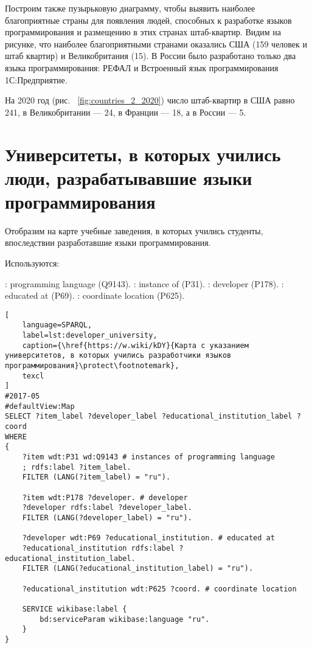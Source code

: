 Построим также пузырьковую диаграмму, чтобы выявить наиболее благоприятные страны для появления людей, способных к разработке языков программирования и размещению в этих странах штаб-квартир. Видим на рисунке, что наиболее благоприятными странами оказались США (159 человек и штаб квартир) и Великобритания (15). В России было разработано только два языка программирования: РЕФАЛ и Встроенный язык программирования 1С:Предприятие.

На 2020 год (рис. ~\ref{fig:countries_2_2020}) число штаб-квартир в США равно 241, в Великобритании — 24, в Франции — 18, а в России — 5.

\section{Университеты, в которых учились люди, разрабатывавшие языки программирования}
Отобразим на карте учебные заведения, в которых учились студенты, впоследствии разработавшие языки программирования.

Используются:
\begin{itemize}
: programming language (Q9143).
: instance of (P31).
: developer (P178).
: educated at (P69).
: coordinate location (P625).
\end{itemize}


\begin{lstlisting}[
	language=SPARQL,
	label=lst:developer_university,
	caption={\href{https://w.wiki/kDY}{Карта с указанием университетов, в которых учились разработчики языков программирования}\protect\footnotemark},
	texcl
]
#2017-05
#defaultView:Map
SELECT ?item_label ?developer_label ?educational_institution_label ?coord
WHERE
{
    ?item wdt:P31 wd:Q9143 # instances of programming language
    ; rdfs:label ?item_label. 
    FILTER (LANG(?item_label) = "ru"). 
    
    ?item wdt:P178 ?developer. # developer
    ?developer rdfs:label ?developer_label. 
    FILTER (LANG(?developer_label) = "ru"). 
    	
    ?developer wdt:P69 ?educational_institution. # educated at
    ?educational_institution rdfs:label ?educational_institution_label. 
    FILTER (LANG(?educational_institution_label) = "ru").
    
    ?educational_institution wdt:P625 ?coord. # coordinate location
    
    SERVICE wikibase:label {
        bd:serviceParam wikibase:language "ru".
    } 	
}
\end{lstlisting}

